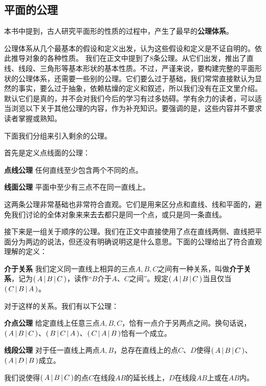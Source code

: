 \documentclass[12pt,UTF8]{ctexbook}
\begin{document}
\begin{appendix}

\chapter{平面的公理}
本书中提到，古人研究平面形的性质的过程中，产生了最早的\textbf{公理体系}。

公理体系从几个最基本的假设和定义出发，认为这些假设和定义是不证自明的。依此推导对象的各种性质。
我们在正文中提到了$8$条公理。从它们出发，推出了直线、线段、三角形等基本形状的基本性质。不过，严谨来说，要构建完整的平面形状的公理体系，还需要一些别的公理。它们要么过于基础，我们常常直接默认为显然的事实，要么过于抽象，依赖枯燥的定义和叙述，所以我们没有在正文里介绍。默认它们是真的，并不会对我们今后的学习有过多妨碍。学有余力的读者，可以适当浏览以下关于其他公理的内容，作为补充知识。要强调的是，这些内容并不要求读者掌握或熟知。

下面我们分组来引入剩余的公理。

首先是定义点线面的公理：
\begin{po}{\textbf{点线公理}}\label{po:1-0}
    任何直线至少包含两个不同的点。
\end{po}
\begin{po}{\textbf{线面公理}}\label{po:1-1}
    平面中至少有三点不在同一直线上。
\end{po}
这两条公理非常基础也非常符合直观。它们是用来区分点和直线、线和平面的，避免我们讨论的全体对象来来去去都只是同一个点，或只是同一条直线。

接下来是一组关于顺序的公理。我们在正文中直接使用了点在直线两侧、直线把平面分为两边的说法，但还没有明确说明这是什么意思。下面的公理给出了符合直观理解的定义：
\begin{df}{\textbf{介于关系}}\label{df:a-0}
    我们定义同一直线上相异的三点$A,B,C$之间有一种关系，叫做\textbf{介于关系}，记为$\displaystyle\left( \,A \,\middle\vert \,B\,\middle\vert \,C \,\right)$，读作“$B$介于$A$、$C$之间”。规定$\displaystyle\left( \,A \,\middle\vert \,B\,\middle\vert \,C \,\right)$当且仅当$\displaystyle\left( \,C \,\middle\vert \,B\,\middle\vert \,A \,\right)$。
\end{df}
对于这样的关系。我们有以下公理：
\begin{po}{\textbf{介点公理}}\label{po:1-2}
    给定直线上任意三点$A,B,C$，恰有一点介于另两点之间。换句话说，$\displaystyle\left( \,A \,\middle\vert \,B\,\middle\vert \,C \,\right)$、$\displaystyle\left( \,B \,\middle\vert \,C\,\middle\vert \,A \,\right)$、$\displaystyle\left( \,C \,\middle\vert \,A\,\middle\vert \,B \,\right)$恰有一个成立。
\end{po}
\begin{po}{\textbf{线段公理}}\label{po:1-3}
    对于任一直线上两点$A,B$，总存在直线上的点$C$、$D$使得$\displaystyle\left( \,A \,\middle\vert \,B\,\middle\vert \,C \,\right)$、$\displaystyle\left( \,A \,\middle\vert \,D\,\middle\vert \,B \,\right)$成立。
\end{po}
我们说使得$\displaystyle\left( \,A \,\middle\vert \,B\,\middle\vert \,C \,\right)$的点$C$在线段$AB$的延长线上，$D$在线段$AB$上或在$AB$内。


\end{appendix}
\end{document}
